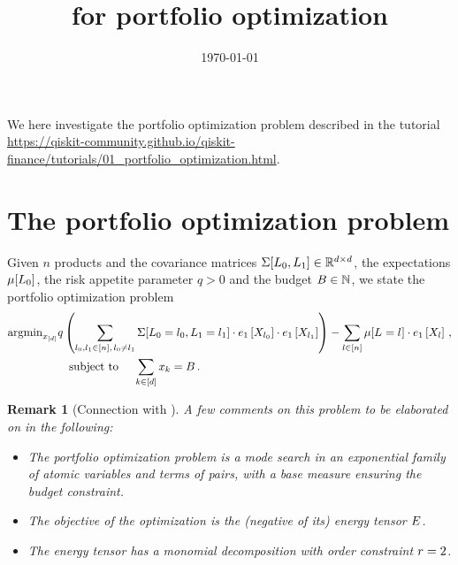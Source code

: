 \documentclass[aps,onecolumn,nofootinbib,pra]{article}
\newtheorem{remark}{Remark}
\begin{document}
\title{\tnreason for portfolio optimization}

\maketitle
\date{\today}

We here investigate the portfolio optimization problem described in the tutorial \url{https://qiskit-community.github.io/qiskit-finance/tutorials/01_portfolio_optimization.html}.

\section{The portfolio optimization problem}

\newcommand{\productsnum}{n}


Given $\productsnum$ products and the covariance matrices $\Sigma[L_{0},L_{1}]\in\mathbb{R}^{d\times d}$, the expectations $\mu[L_{0}]$, the risk appetite parameter $q>0$ and the budget $B\in\mathbb{N}$, we state the portfolio optimization problem
\begin{align}
	\argmin_{\shortcatindices} &
	q \left(\sum_{\selindexof{0},\selindexof{1}\in[\productsnum] , \, \selindexof{0}\neq\selindexof{1}} 
	\Sigma[\indexedselvariableof{0},\indexedselvariableof{1}] \cdot \onehotmapofat{1}{\catvariableof{\selindexof{0}}}\cdot \onehotmapofat{1}{\catvariableof{\selindexof{1}}}\right) 
	- \sum_{\selindex\in[\productsnum]} \mu[\indexedselvariable] \cdot \onehotmapofat{1}{\catvariableof{\selindex}} \, , \\
	& \quad \text{subject to } \quad \sum_{\catenumeratorin}\catindexof{\catenumerator} = B\, . 
\end{align}

\begin{remark}[Connection with \tnreason]
A few comments on this problem to be elaborated on in the following:
\begin{itemize}
	\item	The portfolio optimization problem is a mode search in an exponential family of atomic variables and terms of pairs, with a base measure ensuring the budget constraint.
	\item The objective of the optimization is the (negative of its) energy tensor $E$.
	\item The energy tensor has a monomial decomposition with order constraint $r=2$.
\end{itemize}
\end{remark}
\end{document}
